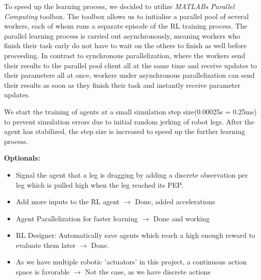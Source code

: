 To speed up the learning process, we decided to utilize \textit{MATLABs Parallel Computing} toolbox.
The toolbox allows us to initialise a parallel pool of several workers, each of whom runs a separate episode of the RL training process.
The parallel learning process is carried out asynchronously, meaning workers who finish their task early do not have to wait on the others to finish as well before proceeding.
In contrast to synchronous parallelization, where the workers send their results to the parallel pool client all at the same time and receive updates to their parameters all at once, workers under asynchronous parallelization can send their results as soon as they finish their task and instantly receive parameter updates.



We start the training of agents at a small simulation step size(0.00025s = 0.25ms) to prevent simulation errors due to initial random jerking of robot legs.
After the agent has stabilized, the step size is increased to speed up the further learning process.
\cite{lillicrap2015continuous}




\textbf{Optionals:}

\begin{itemize}
	\item Signal the agent that a leg is dragging by adding a discrete observation per leg which is pulled high when the leg reached its PEP.
	
	\item Add more inputs to the RL agent $\rightarrow$ Done, added accelerations
	
	\item Agent Parallelization for faster learning $\rightarrow$ Done and working
	
	\item RL Designer: Automatically save agents which reach a high enough reward to evaluate them later $\rightarrow$ Done.
	
	\item As we have multiple robotic 'actuators' in this project, a continuous action space is favorable $\rightarrow$ Not the case, as we have discrete actions
	
\end{itemize}




